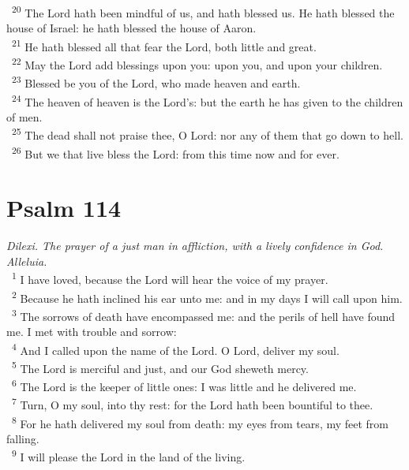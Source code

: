 \documentclass[a5paper,12pt]{article}
\begin{document}
\begin{multicols*}{2}
~\textsuperscript{20} The Lord hath been mindful of us, and hath blessed us. He hath blessed the house of Israel: he hath blessed the house of Aaron.\\
~\textsuperscript{21} He hath blessed all that fear the Lord, both little and great.\\
~\textsuperscript{22} May the Lord add blessings upon you: upon you, and upon your children.\\
~\textsuperscript{23} Blessed be you of the Lord, who made heaven and earth.\\
~\textsuperscript{24} The heaven of heaven is the Lord's: but the earth he has given to the children of men.\\
~\textsuperscript{25} The dead shall not praise thee, O Lord: nor any of them that go down to hell.\\
~\textsuperscript{26} But we that live bless the Lord: from this time now and for ever.\\

\section{Psalm 114}
\label{sec:orgbcbb9cd}
\emph{Dilexi. The prayer of a just man in affliction, with a lively confidence in God. Alleluia.}\\

~\textsuperscript{1} I have loved, because the Lord will hear the voice of my prayer.\\
~\textsuperscript{2} Because he hath inclined his ear unto me: and in my days I will call upon him.\\
~\textsuperscript{3} The sorrows of death have encompassed me: and the perils of hell have found me. I met with trouble and sorrow:\\
~\textsuperscript{4} And I called upon the name of the Lord. O Lord, deliver my soul.\\
~\textsuperscript{5} The Lord is merciful and just, and our God sheweth mercy.\\
~\textsuperscript{6} The Lord is the keeper of little ones: I was little and he delivered me.\\
~\textsuperscript{7} Turn, O my soul, into thy rest: for the Lord hath been bountiful to thee.\\
~\textsuperscript{8} For he hath delivered my soul from death: my eyes from tears, my feet from falling.\\
~\textsuperscript{9} I will please the Lord in the land of the living.\\


\end{multicols*}
\end{document}
